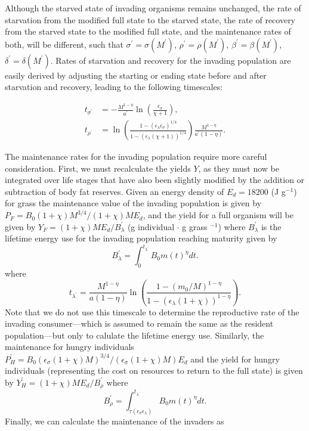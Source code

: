 \documentclass[twocolumn,preprintnumbers,amsmath,amssymb,superscriptaddress]{revtex4}
\begin{document}
\begin{bibunit}[unsrt]
Although the starved state of invading organisms remains unchanged, the rate of starvation from the modified full state to the starved state, the rate of recovery from the starved state to the modified full state, and the maintenance rates of both, will be different, such that $\sigma^\prime = \sigma(M^\prime)$, $\rho^\prime = \rho(M^\prime)$, $\beta^\prime = \beta(M^\prime)$, $\delta^\prime = \delta(M^\prime)$.
Rates of starvation and recovery for the invading population are easily derived by adjusting the starting or ending state before and after starvation and recovery, leading to the following timescales:

\begin{align}
t_{\sigma^\prime} &= -\frac{M^{1-\eta}}{a^{\prime}}\ln \left(\frac{\epsilon_\sigma}{\chi +1}\right), \\ \nonumber
t_{\rho^\prime} &= \ln \left(\frac{1-(\epsilon_\lambda \epsilon_\sigma)^{1/4}}{1-( \epsilon_\lambda(\chi +1))^{1/4}}\right)\frac{M^{1-\eta}}{a^{\prime}\left(1-\eta\right)}.
\end{align}


The maintenance rates for the invading population require more careful consideration.
First, we must recalculate the yields $Y$, as they must now be integrated over life stages that have also been slightly modified by the addition or subtraction of body fat reserves.
Given an energy density of $E_{d}=18200$ (J g$^{-1}$) for grass \citep{estermann} the maintenance value of the invading population is given by $P_{F}=B_{0}(1+\chi)M^{3/4}/(1+\chi)ME_{d}$, and the yield for a full organism will be given by $Y_{F}=(1+\chi)ME_{d}/B^{\prime}_{\lambda}$ (g individual $\cdot$ g grass $^{-1}$) where $B^{\prime}_{\lambda}$ is the lifetime energy use for the invading population reaching maturity given by
\begin{equation}
B^{\prime}_{\lambda}=\int_{0}^{t_{\lambda^\prime}}B_{0}m\left(t\right)^{\eta}dt.
\end{equation}
where
\begin{equation}
t_{\lambda^\prime} = \frac{M^{1-\eta} }{a(1-\eta)}\ln \left(\frac{1-(m_0/M)^{1-\eta}}{1-(\epsilon_\lambda (1+\chi))^{1-\eta}} \right).
\end{equation}
Note that we do not use this timescale to determine the reproductive rate of the invading consumer---which is assumed to remain the same as the resident population---but only to calulate the lifetime energy use.
Similarly, the maintenance for hungry individuals $P^\prime_{H}=B_{0}(\epsilon_{\sigma}(1+\chi)M)^{3/4}/(\epsilon_{\sigma}(1+\chi)M)E_{d}$ and the yield for hungry individuals (representing the cost on resources to return to the full state) is given by $Y^\prime_{H}=(1+\chi)ME_{d}/B^{\prime}_{\rho}$ where
\begin{equation}
B^{\prime}_{\rho}=\int_{\tau\left(\epsilon_{\sigma}\epsilon_{\lambda}\right)}^{t_{\lambda^\prime}}B_{0}m\left(t\right)^{\eta}dt.
\end{equation}
Finally, we can calculate the maintenance of the invaders as


\end{bibunit}
\end{document}
